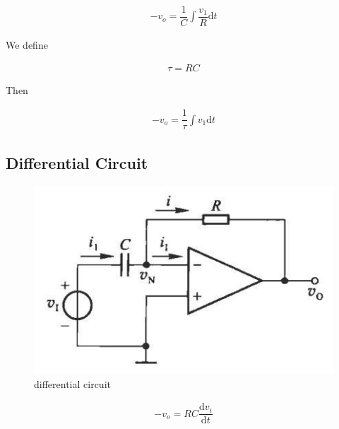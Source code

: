 \begin{equation*}
  \begin{aligned}
    - v_o = \dfrac{1}{C} \int \dfrac{v_{1}}{R} \mathrm{d} t
  \end{aligned}
\end{equation*}

We define

\begin{equation*}
  \begin{aligned}
    \tau = RC
  \end{aligned}
\end{equation*}

Then

\begin{equation*}
  \begin{aligned}
    - v_o = \dfrac{1}{\tau} \int v_{1} \mathrm{d} t
  \end{aligned}
\end{equation*}

\subsection{Differential Circuit}

\begin{figure}[H]
  \centering
  \includegraphics[width=0.4\linewidth]{figures/differential-circuit}
  \caption{differential circuit}
  \label{fig:}
\end{figure}

\begin{equation*}
  \begin{aligned}
    - v_o = R C \dfrac{\mathrm{d} v_i}{\mathrm{d} t} 
  \end{aligned}
\end{equation*}

